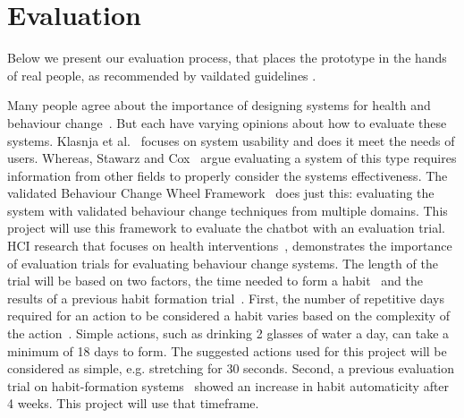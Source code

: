 
\newpage
\section{Evaluation}
Below we present our evaluation process, that places the prototype in the hands of real people, as recommended by vaildated guidelines \cite{article_mhealth, article_evaluate_tech_health_behaviour_change}.

Many people agree about the importance of designing systems for health and behaviour
change~\cite{article_mhealth, article_designing_for_healthy_lifestyles, article_designing_for_health_behaviour_change_hci}.
But each have varying opinions about how to evaluate these systems. Klasnja et al.~\cite{article_evaluate_tech_health_behaviour_change} focuses on system usability and does it meet the needs of users.
Whereas, Stawarz and Cox~\cite{article_designing_for_health_behaviour_change_hci} argue evaluating a system of this type requires information from other fields
to properly consider the systems effectiveness. The validated Behaviour Change Wheel Framework~\cite{article_behaviour_change_wheel} does just this: evaluating the system with validated behaviour change techniques from multiple domains. This project will use this framework to evaluate the chatbot with an evaluation trial. HCI research that focuses on health interventions~\cite{article_mhealth}, demonstrates the importance of evaluation trials for evaluating behaviour change systems. The length of the trial will be based on two factors, the time needed to form a habit~\cite{article_how_habits_formed_modelling_habit_formation} and the results of a previous
habit formation trial~\cite{article_beyond_self_tracking_designing_apps}.
First, the number of repetitive days required for an action to be considered a habit varies based on the complexity of the action~\cite{article_how_habits_formed_modelling_habit_formation}.
Simple actions, such as drinking 2 glasses of water a day, can take a minimum of 18 days to form.
The suggested actions used for this project will be considered as simple, e.g. stretching for 30 seconds.
Second, a previous evaluation trial on habit-formation systems~\cite{article_how_habits_formed_modelling_habit_formation} showed an increase in habit automaticity after 4 weeks.
This project will use that timeframe.


